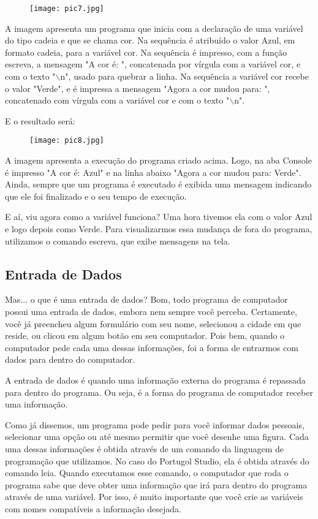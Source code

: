 \documentclass{article}
\begin{document}
\begin{figure}[H]
    \centering
    \texttt{[image: pic7.jpg]}
    \label{fig:pic7}
\end{figure}
A imagem apresenta um programa que inicia com a declaração de uma variável do tipo cadeia e que se chama cor. Na sequência é atribuído o valor Azul, em formato cadeia, para a variável cor. Na sequência é impresso, com a função escreva, a mensagem "A cor é: ", concatenada por vírgula com a variável cor, e com o texto "$\backslash$n", usado para quebrar a linha. Na sequência a variável cor recebe o valor "Verde", e é impressa a mensagem "Agora a cor mudou para: ", concatenado com vírgula com a variável cor e com o texto "$\backslash$n".

E o resultado será:
\begin{figure}[H]
    \centering
    \texttt{[image: pic8.jpg]}
    \label{fig:pic8}
\end{figure}

A imagem apresenta a execução do programa criado acima. Logo, na aba Console é impresso "A cor é:  Azul" e na linha abaixo "Agora a cor mudou para: Verde". Ainda, sempre que um programa é executado é exibida uma mensagem indicando que ele foi finalizado e o seu tempo de execução.

E aí, viu agora como a variável funciona? Uma hora tivemos ela com o valor Azul e logo depois como Verde. Para visualizarmos essa mudança de fora do programa, utilizamos o comando escreva, que exibe mensagens na tela.

\subsection{Entrada de Dados}
Mas... o que é uma entrada de dados? Bom, todo programa de computador possui uma entrada de dados, embora nem sempre você perceba. Certamente, você já preencheu algum formulário com seu nome, selecionou a cidade em que reside, ou clicou em algum botão em seu computador. Pois bem, quando o computador pede cada uma dessas informações, foi a forma de entrarmos com dados para dentro do computador.

A entrada de dados é quando uma informação externa do programa é repassada para dentro do programa. Ou seja, é a forma do programa de computador receber uma informação.

Como já dissemos, um programa pode pedir para você informar dados pessoais, selecionar uma opção ou até mesmo permitir que você desenhe uma figura. Cada uma dessas informações é obtida através de um comando da linguagem de programação que utilizamos. No caso do Portugol Studio, ela é obtida através do comando leia. Quando executamos esse comando, o computador que roda o programa sabe que deve obter uma informação que irá para dentro do programa através de uma variável. Por isso, é muito importante que você crie as variáveis com nomes compatíveis a informação desejada.
\end{document}
